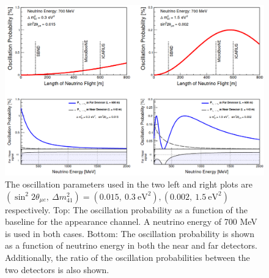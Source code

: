 \begin{figure}[h!]
    \centering
    \includegraphics[width = \hugefigwidth]{figures-chap3/osc_probability.png}
    \caption[SBN oscillation probability.]{The oscillation parameters used in the two left and right plots are $(\sin^2{2\theta_{\mu e}}, ~\Delta m^2_{41}) = (0.015, ~0.3~\text{eV}^2), (0.002, ~1.5~\text{eV}^2)$ respectively. Top: The oscillation probability as a function of the baseline for the \nue appearance channel. A neutrino energy of 700 MeV is used in both cases. Bottom: The oscillation probability is shown as a function of neutrino energy in both the near and far detectors. Additionally, the ratio of the oscillation probabilities between the two detectors is also shown. \cite{SBN_paper}}
    \label{fig:osc_probability}
\end{figure}

